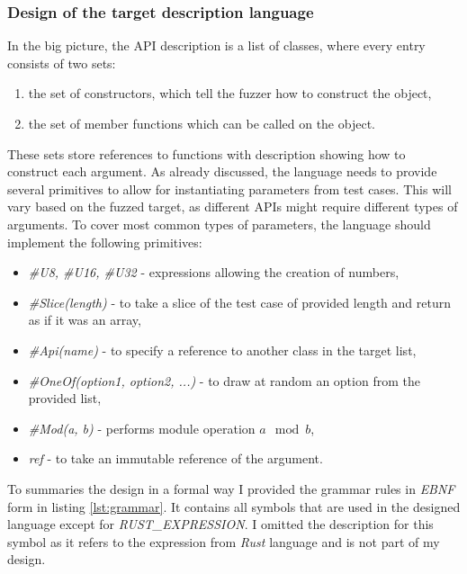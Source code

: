 \subsubsection{Design of the target description language} \label{sec:lang}
In the big picture, the API description is a list of classes, where every entry consists of two sets:
\begin{enumerate}
    \item the set of constructors, which tell the fuzzer how to construct the object,
    \item the set of member functions which can be called on the object.
\end{enumerate}
These sets store references to functions with description showing how to construct each argument. As already discussed, the language needs to provide several primitives to allow for instantiating parameters from test cases. This will vary based on the fuzzed target, as different APIs might require different types of arguments. To cover most common types of parameters, the language should implement the following primitives:
\begin{itemize}
    \item \textit{\#U8, \#U16, \#U32} - expressions allowing the creation of numbers,
    \item \textit{\#Slice(length)} - to take a slice of the test case of provided length and return as if it was an array, 
    \item \textit{\#Api(name)} - to specify a reference to another class in the target list,
    \item \textit{\#OneOf(option1, option2, ...)} - to draw at random an option from the provided list,
    \item \textit{\#Mod(a, b)} - performs module operation $a \mod b$,
    \item \textit{ref } - to take an immutable reference of the argument.
\end{itemize}
To summaries the design in a formal way I provided the grammar rules in \textit{EBNF} form in listing \ref{lst:grammar}. It contains all symbols that are used in the designed language except for \textit{RUST\_EXPRESSION}. I omitted the description for this symbol as it refers to the expression from \textit{Rust} language and is not part of my design.

